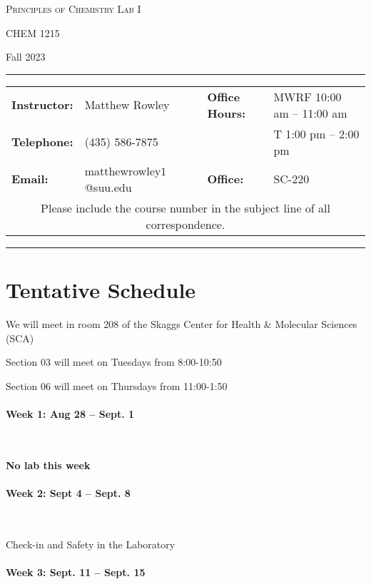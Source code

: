 \documentclass[12pt, letterpaper]{article}
\begin{document}
	\begin{center}
		{\Large \textsc{Principles of Chemistry Lab I}}
		
		CHEM 1215
	\end{center}
	\begin{center}
		{\large Fall 2023}
	\end{center}
	\begin{center}
		\rule{0.99\textwidth}{0.4pt}
		\begin{tabular}{llcll}
			\textbf{Instructor:} & Matthew Rowley           &  & \textbf{Office Hours:} & MWRF 10:00 am -- 11:00 am \\
			\textbf{Telephone:}  & (435) 586-7875           &  &                        & T 1:00 pm -- 2:00 pm    \\
			\textbf{Email:}      & matthewrowley$1$@suu.edu &  & \textbf{Office:}       & SC-220                   \\
			\multicolumn{5}{c}{Please include the course number in the subject line of all correspondence.}
		\end{tabular}
		\rule{0.99\textwidth}{0.4pt}
	\end{center}

\section*{Tentative Schedule}
We will meet in room 208 of the Skaggs Center for Health \& Molecular Sciences (SCA)
\begin{description}
	\item Section 03 will meet on Tuesdays from 8:00-10:50
	\item Section 06 will meet on Thursdays from 11:00-1:50
\end{description}

\paragraph*{Week 1: Aug 28 -- Sept. 1}~

\textbf{No lab this week}

\paragraph{Week 2: Sept 4 -- Sept. 8}~

Check-in and Safety in the Laboratory

\paragraph{Week 3: Sept. 11 -- Sept. 15}~
\end{document}
